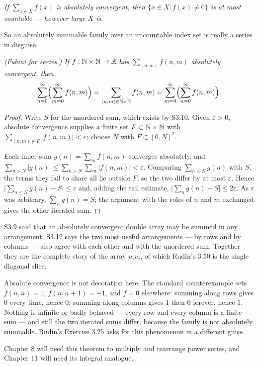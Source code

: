 \emph{If $\sum_{x\in X} f(x)$ is absolutely convergent, then
$\{x \in X : f(x) \ne 0\}$ is at most countable --- however large $X$ is.}

\noindent
So an absolutely summable family over an uncountable index set is really a
series in disguise.

\emph{(Fubini for series.) If $f : \mathbb{N} \times \mathbb{N} \to \mathbb{R}$ has
$\sum_{(n,m)} f(n,m)$ absolutely convergent, then}
\[ \sum_{n=0}^{\infty}\Bigl(\sum_{m=0}^{\infty} f(n,m)\Bigr)
   = \sum_{(n,m) \in \mathbb{N}\times\mathbb{N}} f(n,m)
   = \sum_{m=0}^{\infty}\Bigl(\sum_{n=0}^{\infty} f(n,m)\Bigr). \]
\begin{proof}
Write $S$ for the unordered sum, which exists by S3.10. Given
$\varepsilon>0$, absolute convergence supplies a finite set
$F \subset \mathbb{N}\times\mathbb{N}$ with $\sum_{(n,m)\notin F} |f(n,m)| < \varepsilon$;
choose $N$ with $F \subset [0,N]^2$.

Each inner sum $g(n) = \sum_m f(n,m)$ converges absolutely, and
$\sum_{n>N} |g(n)| \le \sum_{n>N}\sum_m |f(n,m)| < \varepsilon$. Comparing
$\sum_{n \le N} g(n)$ with $S$, the terms they fail to share all lie outside
$F$, so the two differ by at most $\varepsilon$. Hence
$\bigl|\sum_{n\le N}g(n) - S\bigr| \le \varepsilon$ and, adding the tail
estimate, $\bigl|\sum_{n} g(n) - S\bigr| \le 2\varepsilon$. As $\varepsilon$
was arbitrary, $\sum_n g(n) = S$; the argument with the roles of $n$ and $m$
exchanged gives the other iterated sum.
\end{proof}

\begin{deeper}
S3.9 said that an absolutely convergent double array may be summed in any
arrangement. S3.12 says the two most useful arrangements --- by rows and by
columns --- also agree with each other and with the unordered sum. Together
they are the complete story of the array $u_iv_j$, of which Rudin's 3.50 is
the single diagonal slice.

Absolute convergence is not decoration here. The standard counterexample sets
$f(n,n) = 1$, $f(n,n+1) = -1$, and $f = 0$ elsewhere: summing along rows
gives $0$ every time, hence $0$; summing along columns gives $1$ then $0$
forever, hence $1$. Nothing is infinite or badly behaved --- every row and
every column is a finite sum --- and still the two iterated sums differ,
because the family is not absolutely summable. Rudin's Exercise 3.25 asks for
this phenomenon in a different guise.

Chapter 8 will need this theorem to multiply and rearrange power series, and
Chapter 11 will need its integral analogue.
\end{deeper}

